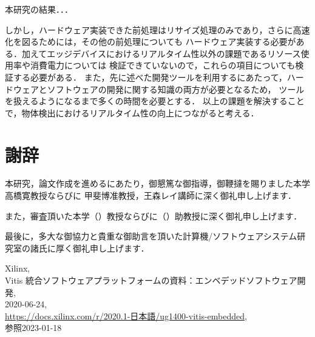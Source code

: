 \documentclass[11pt,a4j]{jreport}
\begin{document}
本研究の結果．．．

しかし，ハードウェア実装できた前処理はリサイズ処理のみであり，さらに高速化を図るためには，その他の前処理についても
ハードウェア実装する必要がある．加えてエッジデバイスにおけるリアルタイム性以外の課題であるリソース使用率や消費電力については
検証できていないので，これらの項目についても検証する必要がある．
また，先に述べた開発ツールを利用するにあたって，ハードウェアとソフトウェアの開発に関する知識の両方が必要となるため，
ツールを扱えるようになるまで多くの時間を必要とする．
以上の課題を解決することで，物体検出におけるリアルタイム性の向上につながると考える．

\chapter*{謝辞} %
本研究，論文作成を進めるにあたり，御懇篤な御指導，御鞭撻を賜りました本学高橋寛教授ならびに
甲斐博准教授，王森レイ講師に深く御礼申し上げます．

また，審査頂いた本学（）教授ならびに（）助教授に深く御礼申し上げます．

最後に，多大な御協力と貴重な御助言を頂いた計算機/ソフトウェアシステム研究室の諸氏に厚く御礼申し上げます．
\renewcommand{\bibname}{参考文献} %
\begin{thebibliography}{99}
   Xilinx, \\Vitis 統合ソフトウェアプラットフォームの資料：エンベデッドソフトウェア開発, \\2020-06-24, \\\url{https://docs.xilinx.com/r/2020.1-日本語/ug1400-vitis-embedded}, \\参照2023-01-18
\end{thebibliography}
\end{document}
